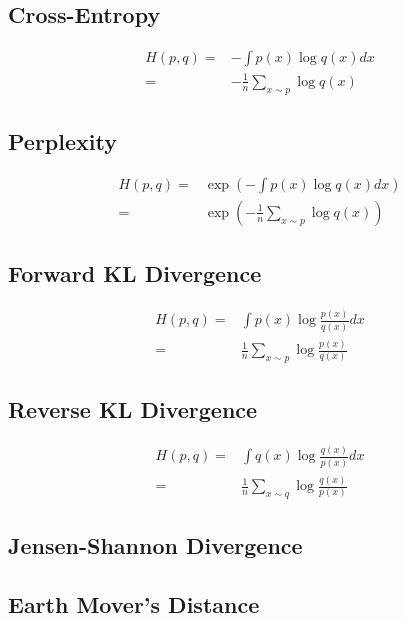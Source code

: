 \documentclass{article}
\begin{document}
\subsection{Cross-Entropy}
\begin{equation}
  \begin{aligned}
    H(p, q) =& - \int p(x) \log q(x) dx \\
    =& - \frac{1}{n} \sum_{x \sim p} \log q(x)
  \end{aligned}
\end{equation}
\subsection{Perplexity}
\begin{equation}
  \begin{aligned}
    H(p, q) =& \exp \left( - \int p(x) \log q(x) dx \right) \\
    =& \exp \left(- \frac{1}{n} \sum_{x \sim p} \log q(x) \right)
  \end{aligned}
\end{equation}
\subsection{Forward KL Divergence}
\begin{equation}
  \begin{aligned}
    H(p, q) =& \int p(x) \log \frac{p(x)}{q(x)} dx  \\
    =&  \frac{1}{n} \sum_{x \sim p} \log \frac{p(x)}{q(x)}
  \end{aligned}
\end{equation}
\subsection{Reverse KL Divergence}
\begin{equation}
  \begin{aligned}
    H(p, q) =& \int q(x) \log \frac{q(x)}{p(x)} dx  \\
    =&  \frac{1}{n} \sum_{x \sim q} \log \frac{q(x)}{p(x)}
  \end{aligned}
\end{equation}
\subsection{Jensen-Shannon Divergence}
\subsection{Earth Mover's Distance}
\end{document}

